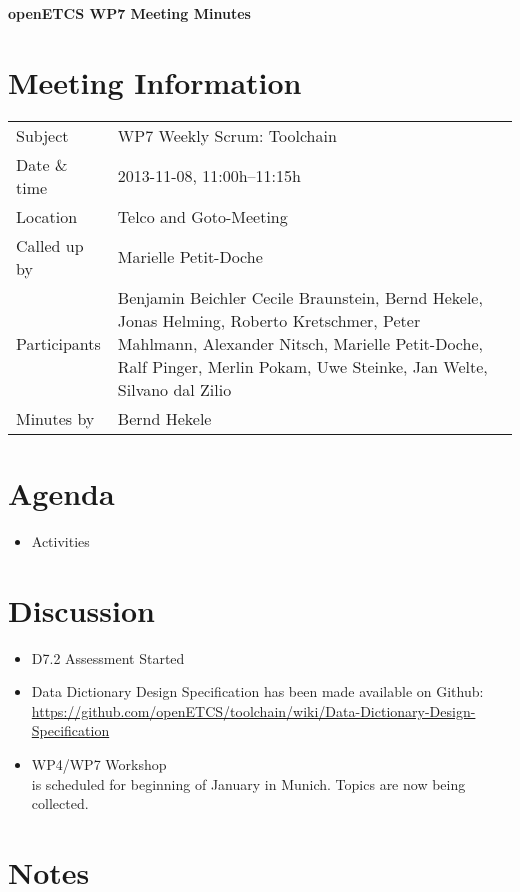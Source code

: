 \documentclass[a4paper, 11pt]{article}
\begin{document}
{\begin{center}\huge\bf openETCS WP7 Meeting Minutes\end{center}}
\section{Meeting Information}

\renewcommand{\arraystretch}{1.5}
\begin{supertabular}{m{.2\textwidth}m{.8\textwidth}}
Subject & WP7 Weekly Scrum: Toolchain\\
Date \& time & 2013-11-08, 11:00h--11:15h\\
Location & Telco and Goto-Meeting\\
Called up by & 
Marielle Petit-Doche\\
Participants &
Benjamin Beichler
Cecile Braunstein,
Bernd Hekele,
Jonas Helming,
Roberto Kretschmer,
Peter Mahlmann,
Alexander Nitsch,
Marielle Petit-Doche,
Ralf Pinger,
Merlin Pokam,
Uwe Steinke,
Jan Welte,
Silvano dal Zilio
\\

Minutes by & Bernd Hekele\\

\end{supertabular}
\renewcommand{\arraystretch}{1.0}


\section{Agenda}
\begin{itemize}
\item Activities
\end{itemize}

\section{Discussion}

\begin{itemize}
\item D7.2 Assessment Started
\item Data Dictionary Design Specification
has been made available on Github: \url{https://github.com/openETCS/toolchain/wiki/Data-Dictionary-Design-Specification}

\item WP4/WP7 Workshop\\
is scheduled for beginning of January in Munich. Topics are now being collected.


\end{itemize}

\section{Notes}
\end{document}
